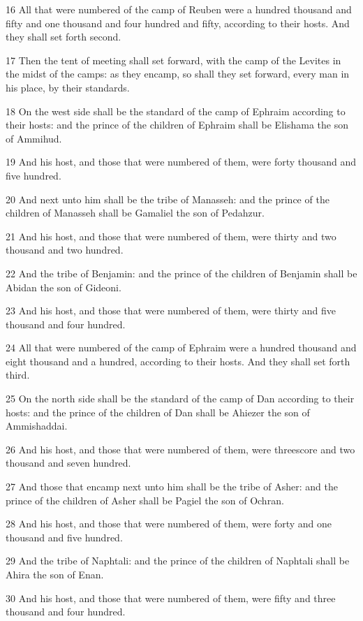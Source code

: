 \par 16 All that were numbered of the camp of Reuben were a hundred thousand and fifty and one thousand and four hundred and fifty, according to their hosts. And they shall set forth second.
\par 17 Then the tent of meeting shall set forward, with the camp of the Levites in the midst of the camps: as they encamp, so shall they set forward, every man in his place, by their standards.
\par 18 On the west side shall be the standard of the camp of Ephraim according to their hosts: and the prince of the children of Ephraim shall be Elishama the son of Ammihud.
\par 19 And his host, and those that were numbered of them, were forty thousand and five hundred.
\par 20 And next unto him shall be the tribe of Manasseh: and the prince of the children of Manasseh shall be Gamaliel the son of Pedahzur.
\par 21 And his host, and those that were numbered of them, were thirty and two thousand and two hundred.
\par 22 And the tribe of Benjamin: and the prince of the children of Benjamin shall be Abidan the son of Gideoni.
\par 23 And his host, and those that were numbered of them, were thirty and five thousand and four hundred.
\par 24 All that were numbered of the camp of Ephraim were a hundred thousand and eight thousand and a hundred, according to their hosts. And they shall set forth third.
\par 25 On the north side shall be the standard of the camp of Dan according to their hosts: and the prince of the children of Dan shall be Ahiezer the son of Ammishaddai.
\par 26 And his host, and those that were numbered of them, were threescore and two thousand and seven hundred.
\par 27 And those that encamp next unto him shall be the tribe of Asher: and the prince of the children of Asher shall be Pagiel the son of Ochran.
\par 28 And his host, and those that were numbered of them, were forty and one thousand and five hundred.
\par 29 And the tribe of Naphtali: and the prince of the children of Naphtali shall be Ahira the son of Enan.
\par 30 And his host, and those that were numbered of them, were fifty and three thousand and four hundred.
